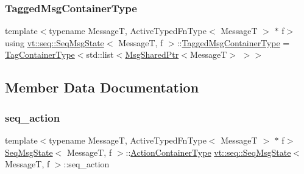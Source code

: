 \subsubsection{\texorpdfstring{Tagged\+Msg\+Container\+Type}{TaggedMsgContainerType}}
{\footnotesize\ttfamily template$<$typename MessageT, Active\+Typed\+Fn\+Type$<$ Message\+T $>$ $\ast$ f$>$ \\
using \hyperlink{structvt_1_1seq_1_1_seq_msg_state}{vt\+::seq\+::\+Seq\+Msg\+State}$<$ MessageT, f $>$\+::\hyperlink{structvt_1_1seq_1_1_seq_msg_state_a57de558c4a7efb36b5358117c6f6d4c5}{Tagged\+Msg\+Container\+Type} =  \hyperlink{structvt_1_1seq_1_1_seq_msg_state_af44de5aa05c93ee8fa1bc2a84c7107bb}{Tag\+Container\+Type}$<$std\+::list$<$\hyperlink{namespacevt_ab2b3d506ec8e8d1540aede826d84a239}{Msg\+Shared\+Ptr}$<$MessageT$>$ $>$$>$}



\subsection{Member Data Documentation}
\mbox{\label{structvt_1_1seq_1_1_seq_msg_state_a6b3ec1ba43d08da03dd01ab35c09183e}} 
\subsubsection{\texorpdfstring{seq\+\_\+action}{seq\_action}}
{\footnotesize\ttfamily template$<$typename MessageT, Active\+Typed\+Fn\+Type$<$ Message\+T $>$ $\ast$ f$>$ \\
\hyperlink{structvt_1_1seq_1_1_seq_msg_state}{Seq\+Msg\+State}$<$ MessageT, f $>$\+::\hyperlink{structvt_1_1seq_1_1_seq_msg_state_a8a998ddbdeee6bd4882f82e0cb1cd6f1}{Action\+Container\+Type} \hyperlink{structvt_1_1seq_1_1_seq_msg_state}{vt\+::seq\+::\+Seq\+Msg\+State}$<$ MessageT, f $>$\+::seq\+\_\+action\hspace{0.3cm}{\ttfamily [static]}}

\mbox{\label{structvt_1_1seq_1_1_seq_msg_state_adfedcf2ab7380df759c8cf2f6c7dd481}} 
